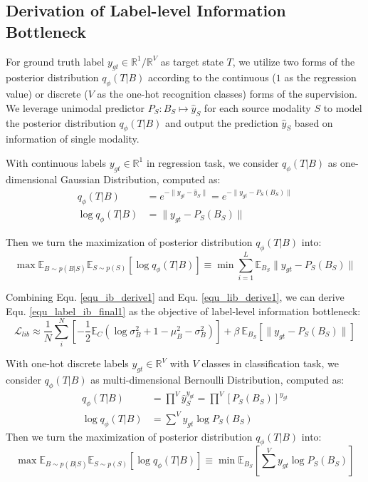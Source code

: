 \documentclass{article}
\begin{document}
\subsection{Derivation of Label-level Information Bottleneck} For ground truth label $y_{gt}\in\mathbb{R}^{1}/\mathbb{R}^{V}$ as target state $T$, we utilize two forms of the posterior distribution $q_\phi(T|B)$ according to the continuous ($1$ as the regression value) or discrete ($V$ as the one-hot recognition classes) forms of the supervision. We leverage unimodal predictor $P_S:B_S\mapsto \hat{y}_S$ for each source modality $S$ to model the posterior distribution $q_\phi(T|B)$ and output the prediction $\hat{y}_S$ based on information of single modality.

With continuous labels $y_{gt}\in\mathbb{R}^{1}$ in regression task, we consider $q_\phi(T|B)$ as one-dimensional Gaussian Distribution, computed as:
\begin{equation}
\begin{aligned}
    q_\phi(T|B) &= e^{-\parallel y_{gt}-\hat{y}_S\parallel} = e^{-\parallel y_{gt}-P_S(B_S)\parallel}\\
    \log{q_\phi(T|B)}&= \parallel y_{gt}-P_S(B_S)\parallel
\end{aligned}
\end{equation}

Then we turn the maximization of posterior distribution $q_\phi(T|B)$ into:
\begin{equation}
    \max \mathbb{E}_{B\sim p(B|S)}\mathbb{E}_{S\sim p(S)} [\log q_\phi(T|B)] \equiv \min \sum^L_{i=1}\mathbb{E}_{B_S} \parallel y_{gt}-P_S(B_S)\parallel
\label{equ_lib_derive1}
\end{equation}

Combining Equ. \ref{equ_ib_derive1} and Equ. \ref{equ_lib_derive1}, we can derive Equ. \ref{equ_label_ib_final1} as the objective of label-level information bottleneck:
\begin{equation}
    \mathcal{L}_{lib} \approx \frac{1}{N}\sum^N_{i} \left[-\frac{1}{2} \mathbb{E}_C  \left(\log \sigma^2_B + 1 - \mu^2_B-\sigma^2_B\right) \right] + \beta\ \mathbb{E}_{B_S} [\parallel y_{gt}-P_S(B_S)\parallel]
\end{equation}

With one-hot discrete labels $y_{gt}\in\mathbb{R}^{V}$ with $V$ classes in classification task,  we consider $q_\phi(T|B)$ as multi-dimensional Bernoulli Distribution, computed as:
\begin{equation}
\begin{aligned}
    q_\phi(T|B) &= \prod^V \hat{y}_S^{y_{gt}}= \prod^V [P_S(B_S)]^{y_{gt}}\\
    \log{q_\phi(T|B)}&= \sum^V y_{gt}\log{P_S(B_S)}
\end{aligned}
\end{equation}
Then we turn the maximization of posterior distribution $q_\phi(T|B)$ into:
\begin{equation}
    \max \mathbb{E}_{B\sim p(B|S)}\mathbb{E}_{S\sim p(S)} [\log q_\phi(T|B)] \equiv \min \mathbb{E}_{B_S} [\sum^V y_{gt}\log{P_S(B_S)}]
\label{equ_lib_derive2}
\end{equation}
\end{document}
